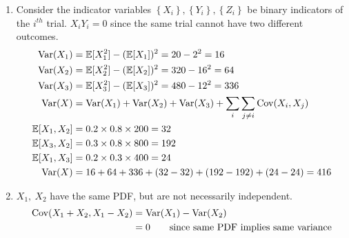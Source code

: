 \begin{enumerate}
	\item Consider the indicator variables $ \left\{X_i\right\}, \left\{Y_i\right\}, \left\{Z_i\right\} $ be binary indicators of the $ i^{th} $ trial. $ X_i Y_i  = 0$ since the same trial cannot have two different outcomes.\\
	\begin{subequations}
		\begin{align}
			\mathrm{Var}(X_1) &= \mathbb{E}[X_1^2]- (\mathbb{E}[X_1])^2 = 20 - 2^2 = 16 \nonumber \\
			\mathrm{Var}(X_2) &= \mathbb{E}[X_2^2]- (\mathbb{E}[X_2])^2 = 320 - 16^2 = 64 \nonumber \\
			\mathrm{Var}(X_3) &= \mathbb{E}[X_3^2]- (\mathbb{E}[X_3])^2 = 480 - 12^2 = 336 \nonumber \\
			\mathrm{Var}(X) &= \mathrm{Var}(X_1) + \mathrm{Var}(X_2) + \mathrm{Var}(X_3) + \sum\limits_{i} \sum\limits_{j \neq i} \mathrm{Cov}(X_i, X_j)  \\
			\mathbb{E}[X_1, X_2] &= 0.2 \times 0.8 \times 200 = 32 \nonumber \\
			\mathbb{E}[X_3, X_2] &= 0.3 \times 0.8 \times 800 = 192 \nonumber \\
			\mathbb{E}[X_1, X_3] &= 0.2 \times 0.3 \times 400 = 24 \nonumber \\
			\mathrm{Var}(X) &= 16 + 64 + 336 + (32 - 32) + (192 - 192) + (24 - 24) = 416
		\end{align} \\
	\end{subequations}
	
	\item $ X_1,\ X_2 $ have the same PDF, but are not necessarily independent.\\
	\begin{subequations}
		\begin{align}
			\mathrm{Cov}(X_1 + X_2, X_1 - X_2) &= \mathrm{Var}(X_1) - \mathrm{Var}(X_2) \nonumber \\
			&= 0 \qquad \text{since same PDF implies same variance}
		\end{align} \\
	\end{subequations}
	

\end{enumerate}
